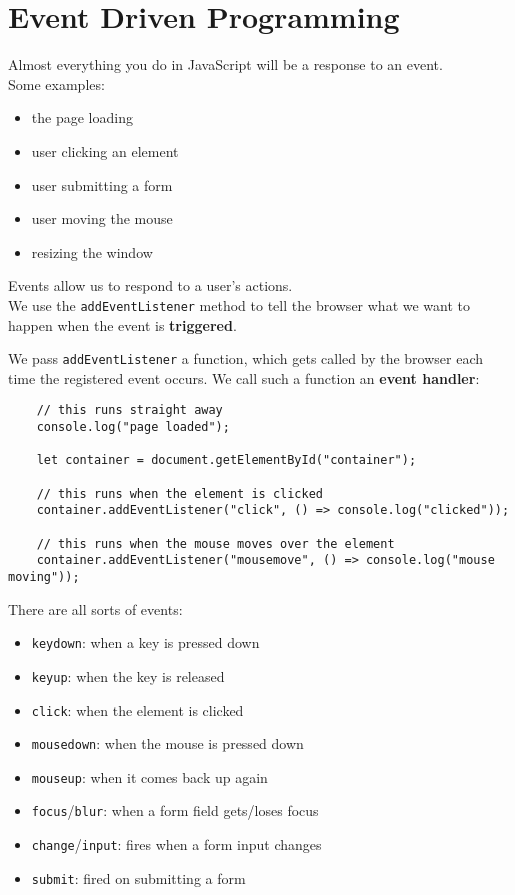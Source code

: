 \section{Event Driven Programming}

Almost everything you do in JavaScript will be a response to an event.
\\

Some examples:

\begin{itemize}
\item the page loading
\item user clicking an element
\item user submitting a form
\item user moving the mouse
\item resizing the window
\end{itemize}

Events allow us to respond to a user's actions.
\\

We use the \texttt{addEventListener} method to tell the browser what we want to happen when the event is \textbf{triggered}.
\\

\pagebreak

We pass \texttt{addEventListener} a function, which gets called by the browser each time the registered event occurs. We call such a function an \textbf{event handler}:

\begin{verbatim}
    // this runs straight away
    console.log("page loaded");

    let container = document.getElementById("container");

    // this runs when the element is clicked
    container.addEventListener("click", () => console.log("clicked"));

    // this runs when the mouse moves over the element
    container.addEventListener("mousemove", () => console.log("mouse moving"));
\end{verbatim}

There are all sorts of events:

\begin{itemize}
    \item \texttt{keydown}: when a key is pressed down
    \item \texttt{keyup}: when the key is released
    \item \texttt{click}: when the element is clicked
    \item \texttt{mousedown}: when the mouse is pressed down
    \item \texttt{mouseup}: when it comes back up again
    \item \texttt{focus}/\texttt{blur}: when a form field gets/loses focus
    \item \texttt{change}/\texttt{input}: fires when a form input changes
    \item \texttt{submit}: fired on submitting a form
\end{itemize}

